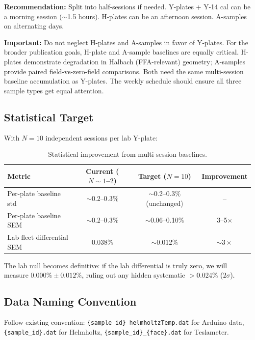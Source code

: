 \documentclass[11pt,letterpaper]{article}
\begin{document}
\textbf{Recommendation:} Split into half-sessions if needed. Y-plates + Y-14 cal
can be a morning session (${\sim}$1.5 hours). H-plates can be an afternoon
session. A-samples on alternating days.

\textbf{Important:} Do not neglect H-plates and A-samples in favor of Y-plates.
For the broader publication goals, H-plate and A-sample baselines are equally
critical. H-plates demonstrate degradation in Halbach (FFA-relevant) geometry;
A-samples provide paired field-vs-zero-field comparisons. Both need the same
multi-session baseline accumulation as Y-plates. The weekly schedule should
ensure all three sample types get equal attention.

\subsection{Statistical Target}

With $N=10$ independent sessions per lab Y-plate:

\begin{table}[htbp]
\centering
\caption{Statistical improvement from multi-session baselines.}
\label{tab:p1-stats}
\begin{tabular}{@{}lccc@{}}
\toprule
Metric & Current ($N \sim 1$--$2$) & Target ($N=10$) & Improvement \\
\midrule
Per-plate baseline std & ${\sim}$0.2--0.3\% & ${\sim}$0.2--0.3\% (unchanged) & -- \\
Per-plate baseline SEM & ${\sim}$0.2--0.3\% & ${\sim}$0.06--0.10\%            & 3--5$\times$ \\
Lab fleet differential SEM & 0.038\%        & ${\sim}$0.012\%                 & ${\sim}3\times$ \\
\bottomrule
\end{tabular}
\end{table}

The lab null becomes definitive: if the lab differential is truly zero, we will
measure $0.000\% \pm 0.012\%$, ruling out any hidden systematic $>$0.024\%
($2\sigma$).

\subsection{Data Naming Convention}

Follow existing convention: \texttt{\{sample\_id\}\_helmholtzTemp.dat} for
Arduino data, \texttt{\{sample\_id\}.dat} for Helmholtz,
\texttt{\{sample\_id\}\_\{face\}.dat} for Teslameter.
\end{document}
